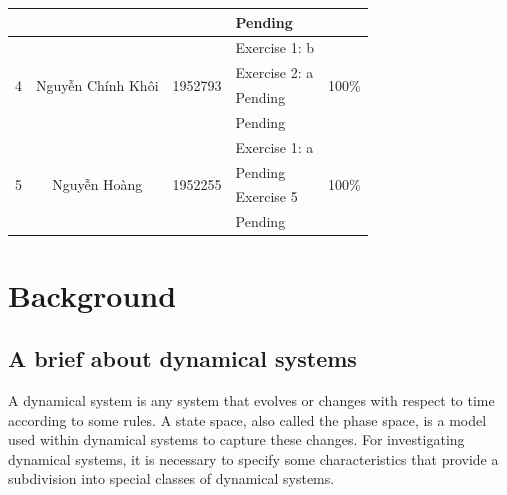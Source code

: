 \documentclass[a4paper]{article}
\begin{document}
\begin{center}
\begin{tabular}{|c|c|c|l|c|}
                       &                                        &                          & \textendash{} Pending          &                             \\
    \hline
    \multirow{4}{*}{4} & \multirow{4}{*}{Nguyễn Chính Khôi}     & \multirow{4}{*}{1952793} & \textendash{} Exercise 1: b    & \multirow{4}{*}{100\%}      \\
                       &                                        &                          & \textendash{} Exercise 2: a    &                             \\
                       &                                        &                          & \textendash{} Pending          &                             \\
                       &                                        &                          & \textendash{} Pending          &                             \\
    \hline
    \multirow{4}{*}{5} & \multirow{4}{*}{Nguyễn Hoàng}          & \multirow{4}{*}{1952255} & \textendash{} Exercise 1: a    & \multirow{4}{*}{100\%}      \\
                       &                                        &                          & \textendash{} Pending          &                             \\
                       &                                        &                          & \textendash{} Exercise 5       &                             \\
                       &                                        &                          & \textendash{} Pending          &                             \\
    \hline
  \end{tabular}
\end{center}


\newpage
\section{Background}
\subsection{A brief about dynamical systems}
A dynamical system is any system that evolves or changes with respect to time according to some rules.
A state space, also called the phase space, is a model used within dynamical systems to capture these changes.
For investigating dynamical systems, it is necessary to specify some characteristics that provide a subdivision into special classes of dynamical systems.
\end{document}
